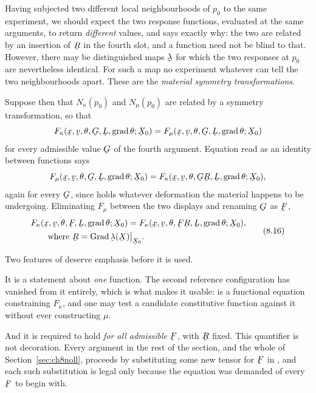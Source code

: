 Having subjected two different local neighbourhoods of $p_{0}$ to the
same experiment, we should expect the two response functions, evaluated
at the same arguments, to return \emph{different} values, and 
says exactly why: the two are related by an insertion of $\bR$ in the
fourth slot, and a function need not be blind to that. However, there
may be distinguished maps $\vek{\lambda}$ for which the two responses at
$p_{0}$ are nevertheless identical. For such a map no experiment
whatever can tell the two neighbourhoods apart. These are the
\emph{material symmetry transformations}.

Suppose then that $N_{\kappa}(p_{0})$ and $N_{\mu}(p_{0})$ are related
by a symmetry transformation, so that
\[
   F_{\kappa}(\bx,\bv,\theta,\bG,\bL,\grad\theta;\bX_{0})
   =F_{\mu}(\bx,\bv,\theta,\bG,\bL,\grad\theta;\bX_{0})
\]
for every admissible value $\bG$ of the fourth argument. Equation
 read as an identity between functions says
\[
   F_{\mu}(\bx,\bv,\theta,\bG,\bL,\grad\theta;\bX_{0})
   =F_{\kappa}(\bx,\bv,\theta,\bG\bR,\bL,\grad\theta;\bX_{0}),
\]
again for every $\bG$, since  holds whatever deformation the
material happens to be undergoing. Eliminating $F_{\mu}$ between the two
displays and renaming $\bG$ as $\bF$,
\begin{equation}
\begin{aligned}
   &F_{\kappa}(\bx,\bv,\theta,\bF,\bL,\grad\theta;\bX_{0})
   =F_{\kappa}(\bx,\bv,\theta,\bF\bR,\bL,\grad\theta;\bX_{0}),\\
   &\qquad\text{where }\bR=\Grad\vek{\lambda}(\bX)\rest{\bX_{0}} .
\end{aligned}
   \tag{8.16}\label{eq:8.16}
\end{equation}

Two features of  deserve emphasis before it is used.

It is a statement about \emph{one} function. The second reference
configuration has vanished from it entirely, which is what makes it
usable:  is a functional equation constraining $F_{\kappa}$,
and one may test a candidate constitutive function against it without
ever constructing $\mu$.

And it is required to hold \emph{for all admissible} $\bF$, with $\bR$
fixed. This quantifier is not decoration. Every argument in the rest of
the section, and the whole of Section~\ref{sec:ch8noll}, proceeds by
substituting some new tensor for $\bF$ in , and each such
substitution is legal only because the equation was demanded of every
$\bF$ to begin with.

